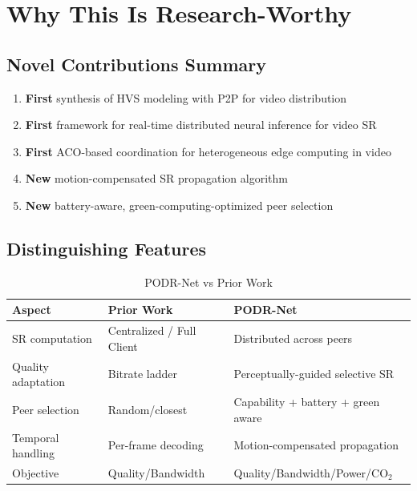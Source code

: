 \documentclass[11pt, a4paper]{article}
\newcommand{\cmark}{\textcolor{secondarygreen}{\ding{51}}}
\begin{document}
\section{Why This Is Research-Worthy}

\subsection{Novel Contributions Summary}

\begin{enumerate}[label=\textcolor{secondarygreen}{\cmark}, leftmargin=*]
    \item \textbf{First} synthesis of HVS modeling with P2P for video distribution
    \item \textbf{First} framework for real-time distributed neural inference for video SR
    \item \textbf{First} ACO-based coordination for heterogeneous edge computing in video
    \item \textbf{New} motion-compensated SR propagation algorithm
    \item \textbf{New} battery-aware, green-computing-optimized peer selection
\end{enumerate}

\subsection{Distinguishing Features}

\begin{table}[H]
\centering
\caption{PODR-Net vs Prior Work}
\begin{tabular}{>{\raggedright}p{3cm} p{4cm} p{5cm}}
\toprule
\textbf{Aspect} & \textbf{Prior Work} & \textbf{PODR-Net} \\
\midrule
\rowcolor{lightbg} SR computation & Centralized / Full Client & \textcolor{secondarygreen}{Distributed across peers} \\
Quality adaptation & Bitrate ladder & \textcolor{secondarygreen}{Perceptually-guided selective SR} \\
\rowcolor{lightbg} Peer selection & Random/closest & \textcolor{secondarygreen}{Capability + battery + green aware} \\
Temporal handling & Per-frame decoding & \textcolor{secondarygreen}{Motion-compensated propagation} \\
\rowcolor{lightbg} Objective & Quality/Bandwidth & \textcolor{secondarygreen}{Quality/Bandwidth/Power/CO$_2$} \\
\bottomrule
\end{tabular}
\end{table}
\end{document}
